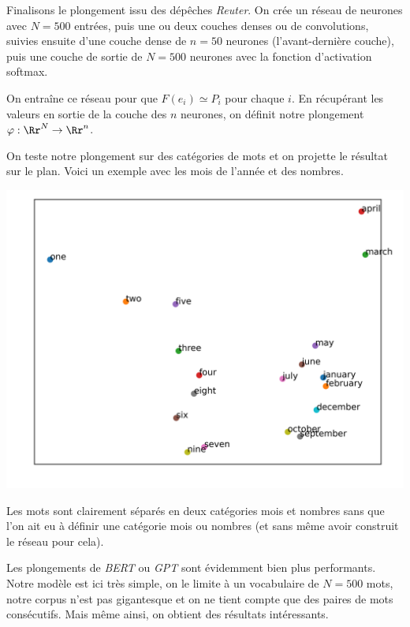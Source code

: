 \documentclass[11pt,class=report,crop=false]{standalone}
\begin{document}
\begin{exemple}
Finalisons le plongement issu des dépêches \emph{Reuter}.
On crée un réseau de neurones avec $N=500$ entrées,
puis une ou deux couches denses ou de convolutions, suivies ensuite d'une couche dense de $n=50$ neurones (l'avant-dernière couche), puis une couche de sortie de $N=500$ neurones avec la fonction d'activation softmax.


On entraîne ce réseau pour que $F(e_i) \simeq P_i$ pour chaque $i$.
En récupérant les valeurs en sortie de la couche des $n$ neurones, on définit notre plongement $\varphi : \Rr^N \to \Rr^n$.

On teste notre plongement sur des catégories de mots et on projette le résultat sur le plan.
Voici un exemple avec les mois de l'année et des nombres.

\begin{center}
	\includegraphics[scale=\myscale,scale=0.8]{figures/plongement-mots-1.png}
\end{center}
Les mots sont clairement séparés en deux catégories \og{}mois\fg{} et \og{}nombres\fg{} sans que l'on ait eu à définir une catégorie \og{}mois\fg{} ou \og{}nombres\fg{} (et sans même avoir construit le réseau pour cela).

Les plongements de \emph{BERT} ou \emph{GPT} sont évidemment bien plus performants.
Notre modèle est ici très simple, on le limite à un vocabulaire de $N=500$ mots, notre corpus n'est pas gigantesque et on ne tient compte que des paires de mots consécutifs. Mais même ainsi, on obtient des résultats intéressants.
\end{exemple}
\end{document}

